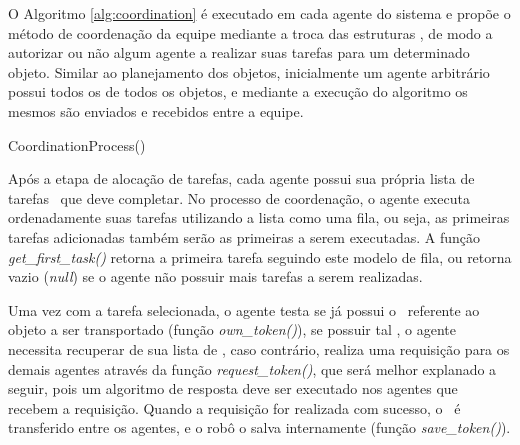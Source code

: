 O Algoritmo \ref{alg:coordination} é executado em cada agente do sistema e propõe o método de coordenação da equipe mediante a troca das estruturas \token, de modo a autorizar ou não algum agente a realizar suas tarefas para um determinado objeto.
Similar ao planejamento dos objetos, inicialmente um agente arbitrário possui todos os  de todos os objetos, e mediante a execução do algoritmo os mesmos são enviados e recebidos entre a equipe.

\begin{algorithm}
  \caption[CoordinationProcess]{CoordinationProcess(\tasklist)}
  \label{alg:coordination}

  \begin{algorithmic}[1]
    \LOOP

      \ENDIF
      \STATE{}

      \ELSE
      \ENDIF

      \STATE{}
      \ENDIF

      \STATE{}

    \ENDLOOP
  \end{algorithmic}
\end{algorithm}

Após a etapa de alocação de tarefas, cada agente possui sua própria lista de tarefas \tasklist\ que deve completar.
No processo de coordenação, o agente executa ordenadamente suas tarefas utilizando a lista como uma fila, ou seja, as primeiras tarefas adicionadas também serão as primeiras a serem executadas.
A função \emph{get\_first\_task()} retorna a primeira tarefa seguindo este modelo de fila, ou retorna vazio (\emph{null}) se o agente não possuir mais tarefas a serem realizadas.

Uma vez com a tarefa selecionada, o agente testa se já possui o \token\ referente ao objeto a ser transportado (função \emph{own\_token()}), se possuir tal \token, o agente necessita recuperar de sua lista de , caso contrário, realiza uma requisição para os demais agentes através da função \emph{request\_token()}, que será melhor explanado a seguir, pois um algoritmo de resposta deve ser executado nos agentes que recebem a requisição.
Quando a requisição for realizada com sucesso, o \token\ é transferido entre os agentes, e o robô o salva internamente (função \emph{save\_token()}).


